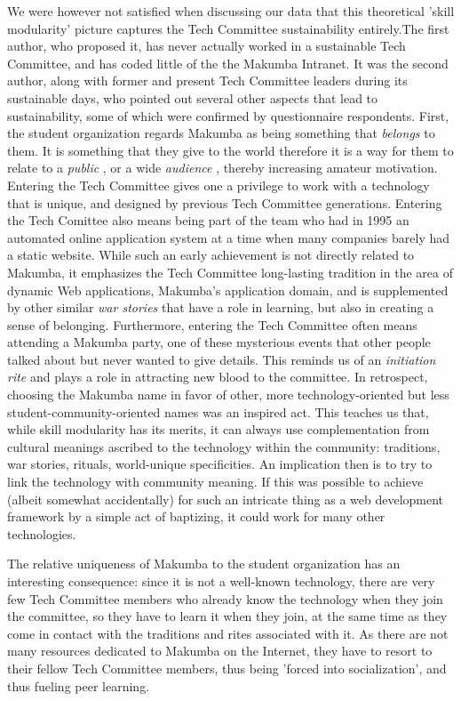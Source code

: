 \documentclass{acm_proc_article-sp}
\begin{document}
We were however not satisfied when discussing our data that this theoretical 'skill modularity' picture captures the Tech Committee sustainability entirely.The first author, who proposed it, has never actually worked in a sustainable Tech Committee, and has coded little of the the Makumba Intranet. It was the second author, along with former and present Tech Committee leaders during its sustainable days, who pointed out  several other aspects that lead to sustainability, some of which were confirmed by questionnaire respondents. First, the student organization regards Makumba as being something that \textit{belongs} to them. It is something that they give to the world therefore it is a way for them to relate to a \textit{public} \cite{stebbins79}, or a wide \textit{audience} \cite{bogdan03}, thereby increasing amateur motivation. Entering the Tech Committee gives one a privilege to work with a technology that is unique, and designed by previous Tech Committee generations. Entering the Tech Comittee also means being part of the team who had in 1995 an automated online application system at a time when many companies barely had a static website. While such an early achievement is not directly related to Makumba, it emphasizes the Tech Committee long-lasting tradition in the area of dynamic Web applications, Makumba's application domain, and is supplemented by other similar \textit{war stories} \cite{orr96} that have a role in learning, but also in creating a sense of belonging. Furthermore, entering the Tech Committee often means attending a Makumba party, one of these mysterious events that other people talked about but never wanted to give details. This reminds us of an \textit{initiation rite} \cite{vanGennep60} and plays a role in attracting new blood to the committee. In retrospect, choosing the Makumba name in favor of other, more technology-oriented but less student-community-oriented names was an inspired act. This teaches us that, while skill modularity has its merits, it can always use complementation from cultural meanings ascribed to the technology within the community: traditions, war stories, rituals, world-unique specificities. An implication then is to try to link the technology with community meaning. If this was possible to achieve (albeit somewhat accidentally) for such an intricate thing as a web development framework by a simple act of baptizing, it could work for many other technologies.

The relative uniqueness of Makumba to the student organization has an interesting consequence: since it is not a well-known technology, there are very few Tech Committee members who already know the technology when they join the committee, so they have to learn it when they join, at the same time as they come in contact with the traditions and rites associated with it. As there are not many resources dedicated to Makumba on the Internet, they have to resort to their fellow Tech Committee members, thus being 'forced into socialization', and thus fueling peer learning.
\end{document}
